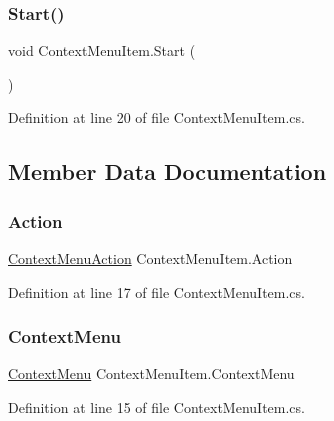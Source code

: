 \subsubsection{\texorpdfstring{Start()}{Start()}}
{\footnotesize\ttfamily void Context\+Menu\+Item.\+Start (\begin{DoxyParamCaption}{ }\end{DoxyParamCaption})}



Definition at line 20 of file Context\+Menu\+Item.\+cs.



\subsection{Member Data Documentation}
\mbox{\label{class_context_menu_item_a576fef6ddb53accdac1874467c39308c}} 
\subsubsection{\texorpdfstring{Action}{Action}}
{\footnotesize\ttfamily \hyperlink{class_context_menu_action}{Context\+Menu\+Action} Context\+Menu\+Item.\+Action}



Definition at line 17 of file Context\+Menu\+Item.\+cs.

\mbox{\label{class_context_menu_item_a627e9d82fe763f0af16a71819ac252fd}} 
\subsubsection{\texorpdfstring{Context\+Menu}{ContextMenu}}
{\footnotesize\ttfamily \hyperlink{class_context_menu}{Context\+Menu} Context\+Menu\+Item.\+Context\+Menu}



Definition at line 15 of file Context\+Menu\+Item.\+cs.

\mbox{\label{class_context_menu_item_a8bbb51ac3e9e78943a861de4c644edb0}} 
